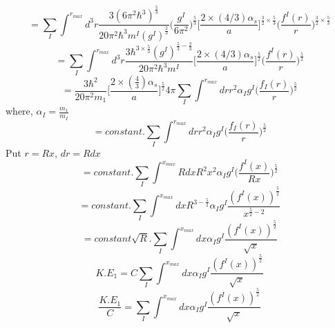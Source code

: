 \documentclass[fleqn, 10pt]{article}
\begin{document}
            \begin{equation*}
            = \sum_I \int^{r_{max}} d^3r \frac{3(6\pi^2\hbar^3)^\frac{5}{3}}{20\pi^2\hbar^3m^I(g^I)^\frac{2}{3}} \biggl(\frac{g^I}{6\pi^2}\biggr)^\frac{5}{3} \biggl[\frac{2 \times (4/3) \alpha_s}{a}\biggr]^{\frac{3}{2} \times \frac{5}{3}} \biggl(\frac{f^I(r)}{r}\biggr)^{\frac{3}{2} \times \frac{5}{3}}
            \end{equation*}
            \begin{equation*}
            = \sum_I\int^{r_{max}}d^3r \frac{3\hbar^{3\times \frac{5}{3}}(g^I)^{\frac{5}{3}-\frac{2}{3}}}{20\pi^2 \hbar^3m^I}\biggl[\frac{2\times(4/3)\alpha_s}{a} \biggr]^\frac{5}{2}\biggl(\frac{f^I(r)}{r}\biggr)^\frac{5}{2}
            \end{equation*}
            \begin{equation*}
            = \frac{3\hbar^2}{20 \pi^2 m_1} \biggl[\frac{2 \times(\frac{4}{3}) \alpha_s}{a}\biggr]^\frac{5}{2} 4\pi \sum_I \int^{r_{max}} dr r^2 \alpha_I g^I \biggl(\frac{f_I(r)}{r}\biggr)^\frac{5}{2} 
            \end{equation*}
            where, 
            $\alpha_I = \frac{m_1}{m_I}$
            \begin{equation*}
            = constant.\sum_I \int^{r_{max}} dr r^2 \alpha_I g^I \biggl(\frac{f_I(r)}{r}\biggr)^\frac{5}{2} 
            \end{equation*}
            Put $r=Rx$, $dr = Rdx$
            \begin{equation*}
            = constant. \sum_I \int^{x_{max}} Rdx R^2 x^2 \alpha_I g^I \biggl(\frac{f^I(x)}{Rx}\biggr)^\frac{5}{2}
            \end{equation*}
            \begin{equation*}
            = constant. \sum_I \int^{x_{max}} dx R^{3 - \frac{5}{2}} \alpha_I g^I \frac{(f^I(x))^\frac{5}{2}}{x^{\frac{5}{2}-2}}
            \end{equation*}
            \begin{equation*}
            = constant\sqrt{R}. \sum_I \int^{x_{max}} dx \alpha_I g^I \frac{(f^I(x))^\frac{5}{2}}{\sqrt{x}}
            \end{equation*}
            \begin{equation*}
            K.E_1 = C \sum_I \int^{x_{max}} dx \alpha_I g^I \frac{(f^I(x))^\frac{5}{2}}{\sqrt{x}}
            \end{equation*}
            \begin{equation*}
            \frac{K.E_1}{C} = \sum_I \int^{x_{max}} dx \alpha_I g^I \frac{(f^I(x))^\frac{5}{2}}{\sqrt{x}}
            \end{equation*}
\end{document}
